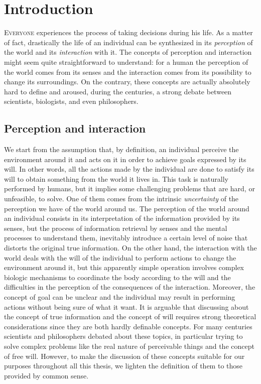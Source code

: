\chapter{Introduction}
\lettrine{E}{veryone} experiences the process of taking decisions during his life. As a matter of fact, drastically the life of an individual can be synthesized in its \textit{perception} of the world and its \textit{interaction} with it. The concepts of perception and interaction might seem quite straightforward to understand: for a human the perception of the world comes from its senses and the interaction comes from its possibility to change its surroundings. On the contrary, these concepts are actually absolutely hard to define and aroused, during the centuries, a strong debate between scientists, biologists, and even philosophers.

\section{Perception and interaction}
We start from the assumption that, by definition, an individual perceive the environment around it and acts on it in order to achieve goals expressed by its will. In other words, all the actions made by the individual are done to satisfy its will to obtain something from the world it lives in. This task is naturally performed by humans, but it implies some challenging problems that are hard, or unfeasible, to solve. One of them comes from the intrinsic \textit{uncertainty} of the perception we have of the world around us. The perception of the world around an individual consists in its interpretation of the information provided by its senses, but the process of information retrieval by senses and the mental processes to understand them, inevitably introduce a certain level of noise that distorts the original true information. On the other hand, the interaction with the world deals with the will of the individual to perform actions to change the environment around it, but this apparently simple operation involves complex biologic mechanisms to coordinate the body according to the will and the difficulties in the perception of the consequences of the interaction. Moreover, the concept of goal can be unclear and the individual may result in performing actions without being sure of what it want.
It is arguable that discussing about the concept of true information and the concept of will requires strong theoretical considerations since they are both hardly definable concepts. For many centuries scientists and philosophers debated about these topics, in particular trying to solve complex problems like the real nature of perceivable things and the concept of free will. However, to make the discussion of these concepts suitable for our purposes throughout all this thesis, we lighten the definition of them to those provided by common sense.

